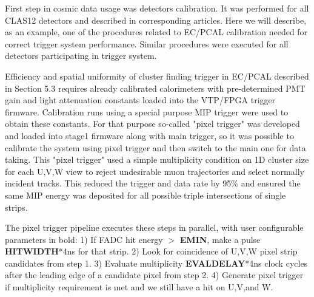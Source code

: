 First step in cosmic data usage was detectors calibration. It was performed for all CLAS12 detectors and described in corresponding articles. Here we will describe, as an example, one of the procedures related to EC/PCAL calibration needed for correct trigger system performance. Similar procedures were executed for all detectors participating in trigger system.

Efficiency and spatial uniformity of cluster finding trigger in EC/PCAL described in Section 5.3 requires already calibrated calorimeters with pre-determined PMT gain and light attenuation constants loaded into the VTP/FPGA trigger firmware.  Calibration runs using a special purpose MIP trigger were used to obtain these constants. For that purpose so-called "pixel trigger" was developed and loaded into stage1 firmware along with main trigger, so it was possible to calibrate the system using pixel trigger and then switch to the main one for data taking. This "pixel trigger" used a simple multiplicity condition on 1D cluster size for each U,V,W view to reject undesirable muon trajectories and select normally incident tracks.  This reduced the trigger and data rate by 95$\%$ and ensured the same MIP energy was deposited for all possible triple intersections of single strips.

The pixel trigger pipeline executes these steps in parallel, with user configurable parameters in bold:
  1) If FADC hit energy $>$ \textbf{EMIN}, make a pulse \textbf{HITWIDTH}*4ns for that strip.
  2) Look for coincidence of U,V,W pixel strip candidates from step 1.
  3) Evaluate multiplicity \textbf{EVALDELAY}*4ns clock cycles after the leading edge of a candidate pixel from step 2.
  4) Generate pixel trigger if multiplicity requirement is met and we still have a hit on U,V,and W. 


